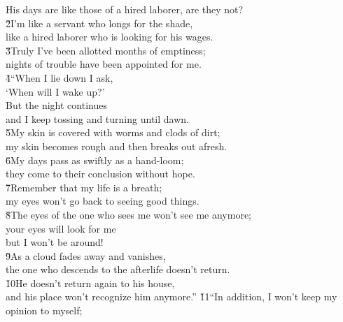 \begin{poetry}
\poemll    His days are like those of a hired laborer, are they not? \\
\poeml \v{2}I'm like a servant who longs for the shade, \\
\poemll    like a hired laborer who is looking for his wages. \\
\poeml \v{3}Truly I've been allotted months of emptiness; \\
\poemll    nights of trouble have been appointed for me. \\
\poeml \v{4}``When I lie down I ask, \\
\poemll    `When will I wake up?' \\
\poeml But the night continues \\
\poemll    and I keep tossing and turning until dawn. \\
\poeml \v{5}My skin is covered with worms and clods of dirt; \\
\poemll    my skin becomes rough and then breaks out afresh. \\
\poeml \v{6}My days pass as swiftly as a hand-loom; \\
\poemll    they come to their conclusion without hope. \\
\poeml \v{7}Remember that my life is a breath; \\
\poemll    my eyes won't go back to seeing good things. \\
\poeml \v{8}The eyes of the one who sees me won't see me anymore; \\
\poemll    your eyes will look for me \\
\poemlll       but I won't be around! \\
\poeml \v{9}As a cloud fades away and vanishes, \\
\poemll    the one who descends to the afterlife doesn't return. \\
\poeml \v{10}He doesn't return again to his house, \\
\poemll    and his place won't recognize him anymore.''
\poeml \v{11}``In addition, I won't keep my opinion to myself; \\

\end{poetry}
